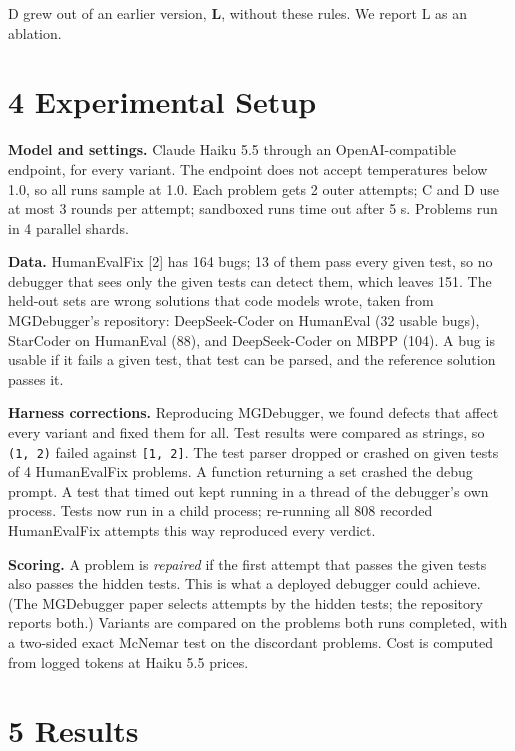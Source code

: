 \documentclass[
  10pt,
  twocolumn]{article}
\begin{document}
D grew out of an earlier version, \textbf{L}, without these rules. We
report L as an ablation.

\hypertarget{experimental-setup}{%
\section{4 Experimental Setup}\label{experimental-setup}}

\textbf{Model and settings.} Claude Haiku 5.5 through an
OpenAI-compatible endpoint, for every variant. The endpoint does not
accept temperatures below 1.0, so all runs sample at 1.0. Each problem
gets 2 outer attempts; C and D use at most 3 rounds per attempt;
sandboxed runs time out after 5 s. Problems run in 4 parallel shards.

\textbf{Data.} HumanEvalFix {[}2{]} has 164 bugs; 13 of them pass every
given test, so no debugger that sees only the given tests can detect
them, which leaves 151. The held-out sets are wrong solutions that code
models wrote, taken from MGDebugger's repository: DeepSeek-Coder on
HumanEval (32 usable bugs), StarCoder on HumanEval (88), and
DeepSeek-Coder on MBPP (104). A bug is usable if it fails a given test,
that test can be parsed, and the reference solution passes it.

\textbf{Harness corrections.} Reproducing MGDebugger, we found defects
that affect every variant and fixed them for all. Test results were
compared as strings, so \texttt{(1,\ 2)} failed against
\texttt{{[}1,\ 2{]}}. The test parser dropped or crashed on given tests
of 4 HumanEvalFix problems. A function returning a set crashed the debug
prompt. A test that timed out kept running in a thread of the debugger's
own process. Tests now run in a child process; re-running all 808
recorded HumanEvalFix attempts this way reproduced every verdict.

\textbf{Scoring.} A problem is \emph{repaired} if the first attempt that
passes the given tests also passes the hidden tests. This is what a
deployed debugger could achieve. (The MGDebugger paper selects attempts
by the hidden tests; the repository reports both.) Variants are compared
on the problems both runs completed, with a two-sided exact McNemar test
on the discordant problems. Cost is computed from logged tokens at Haiku
5.5 prices.

\hypertarget{results}{%
\section{5 Results}\label{results}}
\end{document}
